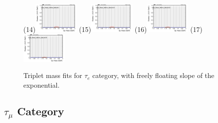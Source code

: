 \begin{figure}[h!]
        \subfigure(14){\includegraphics[width=0.2\textwidth]{power_law/plots/taue/massfit_taue_40bins_bdtcut0.4.png}}
        \subfigure(15){\includegraphics[width=0.2\textwidth]{power_law/plots/taue/massfit_taue_40bins_bdtcut0.46.png}}
        \subfigure(16){\includegraphics[width=0.2\textwidth]{power_law/plots/taue/massfit_taue_40bins_bdtcut0.52.png}}
        \subfigure(17){\includegraphics[width=0.2\textwidth]{power_law/plots/taue/massfit_taue_40bins_bdtcut0.58.png}}
        \caption{Triplet mass fits for $\tau_{e}$ category, with freely floating slope of the exponential.}
        \label{fig:unfixed_taue}
\end{figure}

\newpage

\subsection{$\tau_{\mu}$ Category}
\label{sec:taumu}

